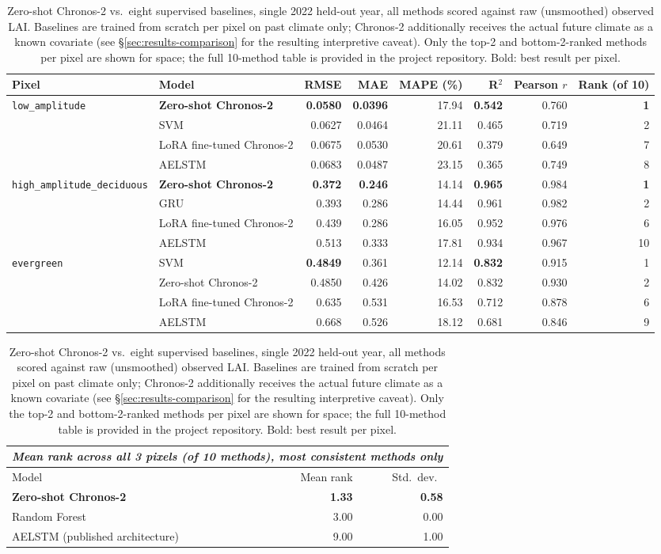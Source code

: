\begin{table}[t]
\centering
\caption{Zero-shot Chronos-2 vs.\ eight supervised baselines, single 2022 held-out year, all
methods scored against raw (unsmoothed) observed LAI. Baselines are trained from scratch per
pixel on past climate only; Chronos-2 additionally receives the actual future climate as a known
covariate (see \S\ref{sec:results-comparison} for the resulting interpretive caveat). Only the
top-2 and bottom-2-ranked methods per pixel are shown for space; the full 10-method table is
provided in the project repository. Bold: best result per pixel.}
\label{tab:main_comparison}
\begin{tabular}{@{}llrrrrrr@{}}
\toprule
Pixel & Model & RMSE & MAE & MAPE (\%) & R$^2$ & Pearson $r$ & Rank (of 10) \\
\midrule
\multirow{4}{*}{\texttt{low\_amplitude}}
 & \textbf{Zero-shot Chronos-2} & \textbf{0.0580} & \textbf{0.0396} & 17.94 & \textbf{0.542} & 0.760 & \textbf{1} \\
 & SVM & 0.0627 & 0.0464 & 21.11 & 0.465 & 0.719 & 2 \\
 & LoRA fine-tuned Chronos-2 & 0.0675 & 0.0530 & 20.61 & 0.379 & 0.649 & 7 \\
 & AELSTM & 0.0683 & 0.0487 & 23.15 & 0.365 & 0.749 & 8 \\
\midrule
\multirow{4}{*}{\texttt{high\_amplitude\_deciduous}}
 & \textbf{Zero-shot Chronos-2} & \textbf{0.372} & \textbf{0.246} & 14.14 & \textbf{0.965} & 0.984 & \textbf{1} \\
 & GRU & 0.393 & 0.286 & 14.44 & 0.961 & 0.982 & 2 \\
 & LoRA fine-tuned Chronos-2 & 0.439 & 0.286 & 16.05 & 0.952 & 0.976 & 6 \\
 & AELSTM & 0.513 & 0.333 & 17.81 & 0.934 & 0.967 & 10 \\
\midrule
\multirow{4}{*}{\texttt{evergreen}}
 & SVM & \textbf{0.4849} & 0.361 & 12.14 & \textbf{0.832} & 0.915 & 1 \\
 & Zero-shot Chronos-2 & 0.4850 & 0.426 & 14.02 & 0.832 & 0.930 & 2 \\
 & LoRA fine-tuned Chronos-2 & 0.635 & 0.531 & 16.53 & 0.712 & 0.878 & 6 \\
 & AELSTM & 0.668 & 0.526 & 18.12 & 0.681 & 0.846 & 9 \\
\bottomrule
\end{tabular}

\vspace{0.5em}
\begin{tabular}{@{}lrr@{}}
\multicolumn{3}{l}{\textit{Mean rank across all 3 pixels (of 10 methods), most consistent methods only}} \\
\toprule
Model & Mean rank & Std.\ dev.\ \\
\midrule
\textbf{Zero-shot Chronos-2} & \textbf{1.33} & \textbf{0.58} \\
Random Forest & 3.00 & 0.00 \\
AELSTM (published architecture) & 9.00 & 1.00 \\
\bottomrule
\end{tabular}
\end{table}

